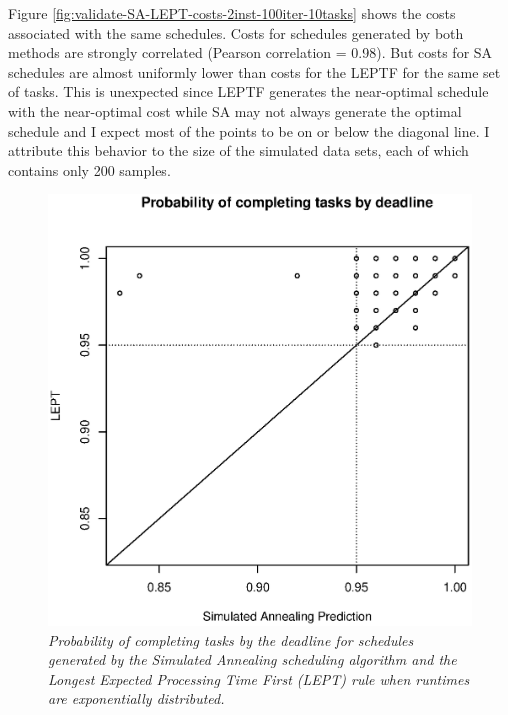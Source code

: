 \documentclass[12pt]{report}
\begin{document}
Figure \ref{fig:validate-SA-LEPT-costs-2inst-100iter-10tasks} shows the costs associated with the same schedules. 
Costs for schedules generated by both methods are strongly correlated (Pearson correlation = 0.98).
But costs for SA schedules are almost uniformly lower than costs for the LEPTF for the same set of tasks.
This is unexpected since LEPTF generates the near-optimal schedule with the near-optimal cost while SA may not always generate the optimal schedule and I expect most of the points to be on or below the diagonal line.
I attribute this behavior to the size of the simulated data sets, each of which contains only 200 samples.

\begin{figure}
\includegraphics[width=1\textwidth]{validate-SA-LEPT-scores-2inst-100iter-10tasks.eps}
\caption{\textit{Probability of completing tasks by the deadline for schedules generated by the Simulated Annealing scheduling algorithm and the Longest Expected Processing Time First (LEPT) rule when runtimes are exponentially distributed.}}
\label{fig:validate-SA-LEPT-scores-2inst-100iter-10tasks}
\end{figure}
\end{document}
